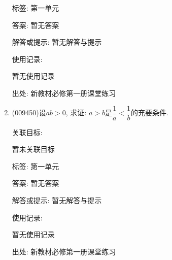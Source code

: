 \documentclass[10pt,a4paper]{article}
\begin{document}
\begin{enumerate}[1.]
标签: 第一单元

答案: 暂无答案

解答或提示: 暂无解答与提示

使用记录:

暂无使用记录


出处: 新教材必修第一册课堂练习
\item { (009450)}设$ab>0$, 求证: $a>b$是$\dfrac 1a<\dfrac 1b$的充要条件.


关联目标:

暂未关联目标



标签: 第一单元

答案: 暂无答案

解答或提示: 暂无解答与提示

使用记录:

暂无使用记录


出处: 新教材必修第一册课堂练习
\end{enumerate}
\end{document}
